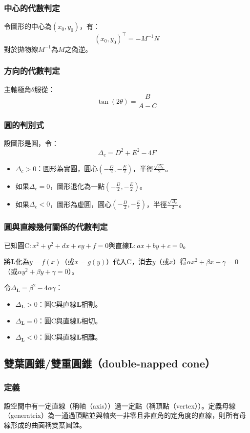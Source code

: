 \documentclass[a4paper,12pt]{article}
\begin{document}
\subsubsection{中心的代數判定}
令圖形的中心為$(x_0,y_0)$，有：
\[(x_0,y_0)^{\top}=-M^{-1}N\]
對於拋物線$M^{-1}$為$M$之偽逆。
\subsubsection{方向的代數判定}
主軸極角$\theta$服從：
\[\tan(2\theta)=\frac{B}{A-C}\]
\subsubsection{圓的判別式}
設圖形是圓，令：
\[\Delta_c=D^2+E^2-4F\]
\begin{itemize}
\item $\Delta_c>0$：圖形為實圓，圓心$(-\frac{D}{2},-\frac{E}{2})$，半徑$\frac{\sqrt{\Delta_c}}{2}$。
\item 如果$\Delta_c=0$，圖形退化為一點$(-\frac{D}{2},-\frac{E}{2})$。
\item 如果$\Delta_c<0$，圖形為虛圓，圓心$(-\frac{D}{2},-\frac{E}{2})$，半徑$\frac{\sqrt{\Delta_c}}{2}$。
\end{itemize}
\subsubsection{圓與直線幾何關係的代數判定}
已知圓$\mathrm{C}:x^2+y^2+dx+ey+f=0$與直線$\mathbf{L}:ax+by+c=0$。

將$\mathbf{L}$化為$y=f(x)$（或$x=g(y)$）代入$\mathrm{C}$，消去$y$（或$x$）得$\alpha x^2+\beta x+\gamma=0$（或$\alpha y^2+\beta y+\gamma=0$）。

令$\Delta_\mathbf{L}=\beta^2-4\alpha\gamma$：
\begin{itemize}
\item $\Delta_\mathbf{L}>0$：圓$\mathrm{C}$與直線$\mathbf{L}$相割。
\item $\Delta_\mathbf{L}=0$：圓$\mathrm{C}$與直線$\displaystyle\mathbf{L}$相切。
\item $\Delta_\mathbf{L}<0$：圓$\mathrm{C}$與直線$\mathbf{L}$相離。
\end{itemize}
\subsection{雙葉圓錐/雙重圓錐（double-napped cone）}
\subsubsection{定義}
設空間中有一定直線（稱軸（axis））過一定點（稱頂點（vertex））。定義母線（generatrix）為一通過頂點並與軸夾一非零且非直角的定角度的直線，則所有母線形成的曲面稱雙葉圓錐。
\end{document}
